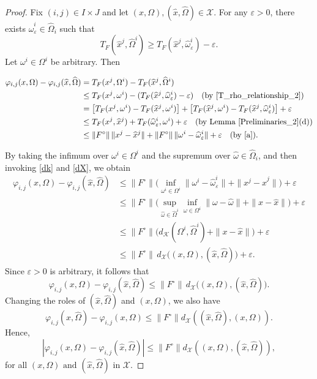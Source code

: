 \documentclass[sn-mathphys-num]{sn-jnl}%
\def\Hat{\widehat}
\theoremstyle{definition}
\begin{document}
\begin{proof}
	Fix $(i,j)\in I\times J$ and let $(x,\Omega),(\Hat x,\Hat \Omega)\in \mathcal{X}$. 
	For any $\varepsilon>0$, there exists $\Hat{\omega}_{\varepsilon}^i\in \Hat{\Omega}_i$ such that
	\[
	T_F(\Hat x^j,\Hat \Omega^i)\ge T_F(\Hat x^j,\Hat \omega^i_{\varepsilon})-\varepsilon.
	\]
	Let $\omega^i\in \Omega^i$ be arbitrary. Then
	
	$$\begin{aligned} \varphi_{i,j}(x,\Omega)-\varphi_{i,j}(\Hat x,\Hat \Omega) &= T_F(x^j,\Omega^i)-T_F(\Hat x^j,\Hat \Omega^i)\\ &\leq T_F(x^j,\omega^i)-(T_F(\Hat x^j,\Hat \omega^i_{\varepsilon})-\varepsilon) \quad(\text{by \eqref{T_rho_relationship_2}})\\ 
		&= \big[T_F(x^j,\omega^i)-T_F(\Hat x^j,\omega^i)\big] + \big[T_F(\Hat x^j,\omega^i)-T_F(\Hat x^j,\Hat \omega^i_{\varepsilon})\big] + \varepsilon\\
		&\leq T_F(x^j,\Hat{x}^j) + T_F(\Hat{\omega}^i_\varepsilon,\omega^i) + \varepsilon \quad(\text{by Lemma \ref{Preliminaries_2}(d)})\\
		&\leq \|F^\circ\|\,\|x^j-\Hat x^j\| + \|F^\circ\|\,\|\omega^i-\Hat \omega^i_{\varepsilon}\| + \varepsilon \quad(\text{by \eqref{a}}). \end{aligned}$$
	
	By taking the infimum over $\omega^i \in \Omega^i$ and the supremum over $\hat{\omega} \in \hat{\Omega}_i$, and then invoking \eqref{dk} and \eqref{dX}, we obtain
	\[
	\begin{aligned}
		\varphi_{i,j}(x,\Omega)-\varphi_{i,j}(\Hat x,\Hat \Omega)
		&\leq \|F^\circ\|\Big(\inf_{\omega^i\in \Omega^i}\|\omega^i-\Hat \omega^i_{\varepsilon}\|
		+\|x^j-\Hat x^j\|\Big) + \varepsilon\\
		&\leq \|F^\circ\|\Big(
		\sup_{\Hat \omega \in \Hat \Omega^i}\inf_{\omega \in \Omega^i}\|\omega-\Hat \omega\|
		+\|x-\Hat x\|
		\Big) + \varepsilon\\
		&\leq \|F^\circ\|\Big(
		d_{\mathcal{K}}(\Omega^i,\Hat \Omega^i)
		+\|x-\Hat x\|
		\Big) + \varepsilon\\
		&\leq \|F^\circ\|\, d_{\mathcal{X}}\big((x,\Omega),(\Hat x,\Hat \Omega)\big) + \varepsilon.
	\end{aligned}
	\]
	Since $\varepsilon>0$ is arbitrary, it follows that
	\[
	\varphi_{i,j}(x,\Omega)-\varphi_{i,j}(\Hat x,\Hat \Omega)
	\leq \|F^\circ\|\, d_{\mathcal{X}}\big((x,\Omega),(\Hat x,\Hat \Omega)\big).
	\]
	Changing the roles of $(\Hat x,\Hat \Omega)$ and $(x,\Omega)$, we also have
	\[
	\varphi_{i,j}(\Hat x,\Hat \Omega)-\varphi_{i,j}(x,\Omega) \leq \|F^\circ\|d_{\mathcal{X}}((\Hat x,\Hat \Omega),(x,\Omega)).
	\]
	Hence,
	\begin{equation*}
		\label{O.V.F_Lipschitz_1_0}
		|\varphi_{i,j}(x,\Omega)-\varphi_{i,j}(\Hat x,\Hat \Omega)| \leq \|F^\circ\|d_{\mathcal{X}}((x,\Omega),(\Hat x,\Hat \Omega)),
	\end{equation*}
	for all $(x,\Omega) \text{ and } (\Hat x,\Hat \Omega)$ in  $\mathcal{X}$.
\end{proof}
\end{document}
